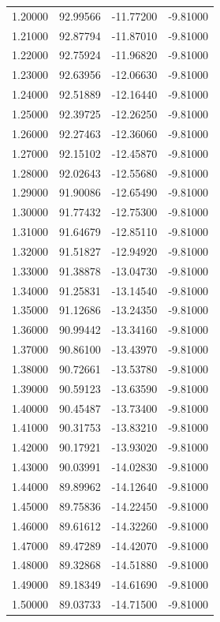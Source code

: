 \begin{table}
\begin{tabular}{llll}
1.20000 & 92.99566 & -11.77200 & -9.81000 \\
1.21000 & 92.87794 & -11.87010 & -9.81000 \\
1.22000 & 92.75924 & -11.96820 & -9.81000 \\
1.23000 & 92.63956 & -12.06630 & -9.81000 \\
1.24000 & 92.51889 & -12.16440 & -9.81000 \\
1.25000 & 92.39725 & -12.26250 & -9.81000 \\
1.26000 & 92.27463 & -12.36060 & -9.81000 \\
1.27000 & 92.15102 & -12.45870 & -9.81000 \\
1.28000 & 92.02643 & -12.55680 & -9.81000 \\
1.29000 & 91.90086 & -12.65490 & -9.81000 \\
1.30000 & 91.77432 & -12.75300 & -9.81000 \\
1.31000 & 91.64679 & -12.85110 & -9.81000 \\
1.32000 & 91.51827 & -12.94920 & -9.81000 \\
1.33000 & 91.38878 & -13.04730 & -9.81000 \\
1.34000 & 91.25831 & -13.14540 & -9.81000 \\
1.35000 & 91.12686 & -13.24350 & -9.81000 \\
1.36000 & 90.99442 & -13.34160 & -9.81000 \\
1.37000 & 90.86100 & -13.43970 & -9.81000 \\
1.38000 & 90.72661 & -13.53780 & -9.81000 \\
1.39000 & 90.59123 & -13.63590 & -9.81000 \\
1.40000 & 90.45487 & -13.73400 & -9.81000 \\
1.41000 & 90.31753 & -13.83210 & -9.81000 \\
1.42000 & 90.17921 & -13.93020 & -9.81000 \\
1.43000 & 90.03991 & -14.02830 & -9.81000 \\
1.44000 & 89.89962 & -14.12640 & -9.81000 \\
1.45000 & 89.75836 & -14.22450 & -9.81000 \\
1.46000 & 89.61612 & -14.32260 & -9.81000 \\
1.47000 & 89.47289 & -14.42070 & -9.81000 \\
1.48000 & 89.32868 & -14.51880 & -9.81000 \\
1.49000 & 89.18349 & -14.61690 & -9.81000 \\
1.50000 & 89.03733 & -14.71500 & -9.81000 \\

\end{tabular}
\end{table}
